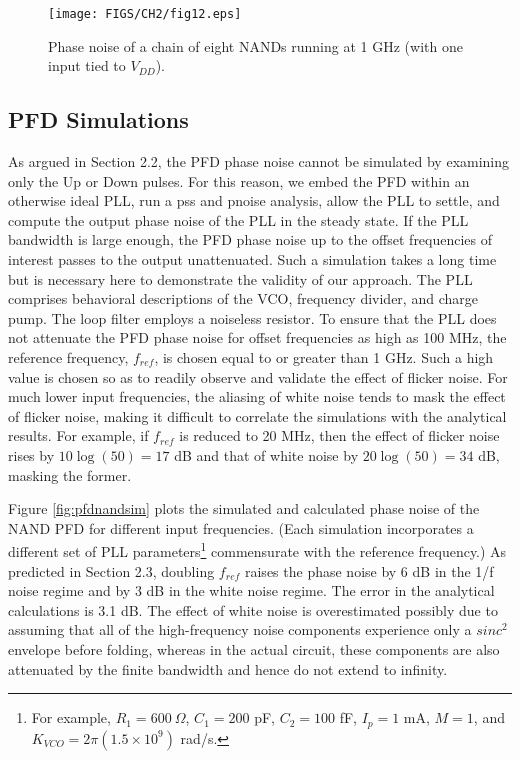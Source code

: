 \begin{figure}[htb!]
\centering
\texttt{[image: FIGS/CH2/fig12.eps]}
\caption{Phase noise of a chain of eight NANDs running at 1 GHz (with one input tied to $V_{DD}$).}
\label{fig:nandchain}
\end{figure} 


\subsection{PFD Simulations}
As argued in Section 2.2, the PFD phase noise cannot be simulated by examining only the Up or Down pulses. For this reason, we embed the
PFD within an otherwise ideal PLL, run a pss and pnoise analysis, allow the PLL to settle, and compute the output phase noise
of the PLL in the steady state. If the PLL bandwidth is large enough, the PFD phase noise up to the offset frequencies of interest passes to
the output unattenuated. Such a simulation takes a long time but is necessary here to demonstrate the validity of our approach.
The PLL comprises behavioral descriptions of the VCO, frequency divider, and charge pump. The loop filter employs a noiseless resistor. To ensure
that the PLL does not attenuate the PFD phase noise for offset frequencies as high as 100 MHz, the reference frequency, $f_{ref}$, is chosen equal to or
greater than 1 GHz. 
{Such a high value is chosen so as to readily observe and validate the effect of flicker noise. 
For much lower input frequencies, the aliasing of white noise tends to mask the effect of flicker noise, making it difficult to correlate the
simulations with the analytical results. For example, if $f_{ref}$ is reduced to 20 MHz, then the effect of flicker noise rises by $10\log(50)=17$
dB and that of white noise by $20\log(50)=34$ dB, masking the former.} 




Figure \ref{fig:pfdnandsim} plots the simulated and calculated phase noise of the NAND PFD for different input frequencies. (Each simulation
incorporates a different set of PLL parameters\footnote{For example, $R_1=600~\Omega$, $C_1=200$ pF, $C_2=100$ fF, $I_p=1$ mA,
$M=1$,
and $K_{VCO}=2\pi(1.5\times 10^9)$ rad/s.} commensurate with the reference frequency.) As predicted in
Section 2.3, doubling $f_{ref}$ raises
the phase noise by 6 dB in the 1/f noise regime and by 3 dB in the white noise regime. The error in the analytical calculations is 3.1 dB. 
{The effect of white noise is overestimated possibly due to assuming that all of the high-frequency noise components experience only a
$ sinc^2$ envelope before folding, whereas in the actual circuit, these components are also attenuated by the finite bandwidth and hence do not
extend to infinity.
}

